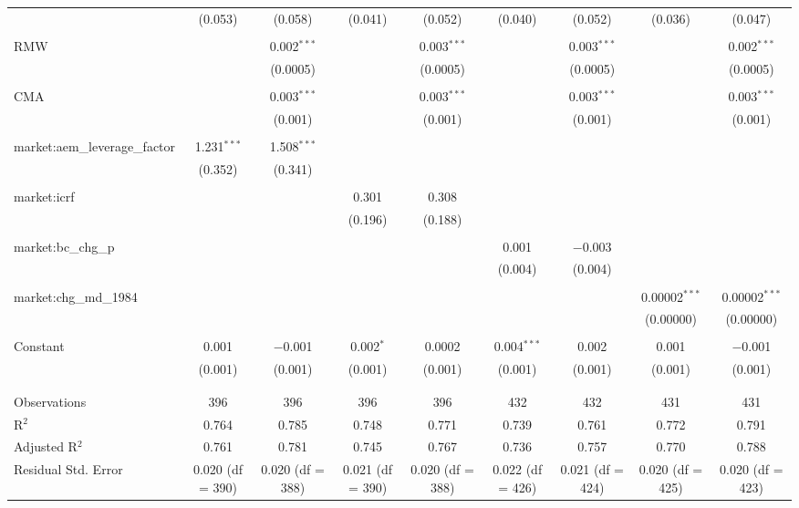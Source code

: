 \begin{table}[!htbp]
\begin{tabular}{@{\extracolsep{5pt}}lcccccccc}
  & (0.053) & (0.058) & (0.041) & (0.052) & (0.040) & (0.052) & (0.036) & (0.047) \\ 
  & & & & & & & & \\ 
 RMW &  & 0.002$^{***}$ &  & 0.003$^{***}$ &  & 0.003$^{***}$ &  & 0.002$^{***}$ \\ 
  &  & (0.0005) &  & (0.0005) &  & (0.0005) &  & (0.0005) \\ 
  & & & & & & & & \\ 
 CMA &  & 0.003$^{***}$ &  & 0.003$^{***}$ &  & 0.003$^{***}$ &  & 0.003$^{***}$ \\ 
  &  & (0.001) &  & (0.001) &  & (0.001) &  & (0.001) \\ 
  & & & & & & & & \\ 
 market:aem\_leverage\_factor & 1.231$^{***}$ & 1.508$^{***}$ &  &  &  &  &  &  \\ 
  & (0.352) & (0.341) &  &  &  &  &  &  \\ 
  & & & & & & & & \\ 
 market:icrf &  &  & 0.301 & 0.308 &  &  &  &  \\ 
  &  &  & (0.196) & (0.188) &  &  &  &  \\ 
  & & & & & & & & \\ 
 market:bc\_chg\_p &  &  &  &  & 0.001 & $-$0.003 &  &  \\ 
  &  &  &  &  & (0.004) & (0.004) &  &  \\ 
  & & & & & & & & \\ 
 market:chg\_md\_1984 &  &  &  &  &  &  & 0.00002$^{***}$ & 0.00002$^{***}$ \\ 
  &  &  &  &  &  &  & (0.00000) & (0.00000) \\ 
  & & & & & & & & \\ 
 Constant & 0.001 & $-$0.001 & 0.002$^{*}$ & 0.0002 & 0.004$^{***}$ & 0.002 & 0.001 & $-$0.001 \\ 
  & (0.001) & (0.001) & (0.001) & (0.001) & (0.001) & (0.001) & (0.001) & (0.001) \\ 
  & & & & & & & & \\ 
\hline \\[-1.8ex] 
Observations & 396 & 396 & 396 & 396 & 432 & 432 & 431 & 431 \\ 
R$^{2}$ & 0.764 & 0.785 & 0.748 & 0.771 & 0.739 & 0.761 & 0.772 & 0.791 \\ 
Adjusted R$^{2}$ & 0.761 & 0.781 & 0.745 & 0.767 & 0.736 & 0.757 & 0.770 & 0.788 \\ 
Residual Std. Error & 0.020 (df = 390) & 0.020 (df = 388) & 0.021 (df = 390) & 0.020 (df = 388) & 0.022 (df = 426) & 0.021 (df = 424) & 0.020 (df = 425) & 0.020 (df = 423) \\ 

\end{tabular}
\end{table}
